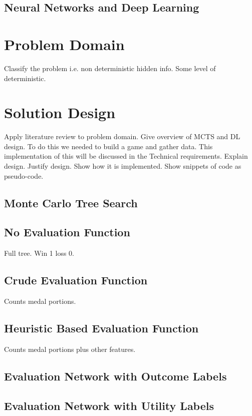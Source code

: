 \documentclass{bhamthesis}
\theoremstyle{definition}
\begin{document}
\section{Neural Networks and Deep Learning}
\blindtext

\chapter{Problem Domain}
Classify the problem i.e. non deterministic hidden info. Some level of deterministic.
\blindtext

\chapter{Solution Design}
Apply literature review to problem domain. Give overview of MCTS and DL design. To do this we needed to build a game and gather data. This implementation of this will be discussed in the Technical requirements.
Explain design.
Justify design.
Show how it is implemented.
Show snippets of code as pseudo-code.

\section{Monte Carlo Tree Search}
\blindtext

\section{No Evaluation Function}
Full tree. Win 1 loss 0.

\section{Crude Evaluation Function}
Counts medal portions.

\section{Heuristic Based Evaluation Function}
Counts medal portions plus other features.

\section{Evaluation Network with Outcome Labels}
\blindtext

\section{Evaluation Network with Utility Labels}
\blindtext
\end{document}
